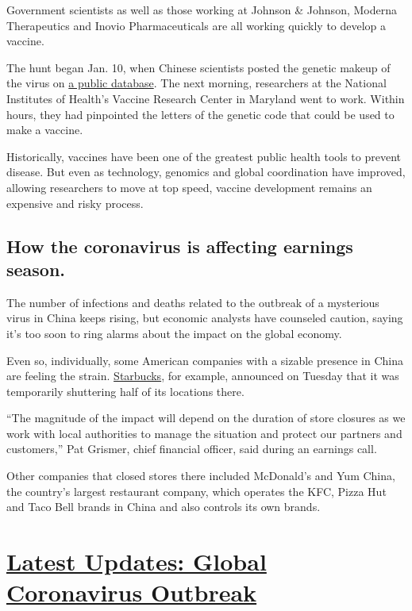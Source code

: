 Government scientists as well as those working at Johnson \& Johnson,
Moderna Therapeutics and Inovio Pharmaceuticals are all working quickly
to develop a vaccine.

The hunt began Jan. 10, when Chinese scientists posted the genetic
makeup of the virus on
\href{https://www.ncbi.nlm.nih.gov/nuccore/MN908947}{a public database}.
The next morning, researchers at the National Institutes of Health's
Vaccine Research Center in Maryland went to work. Within hours, they had
pinpointed the letters of the genetic code that could be used to make a
vaccine.

Historically, vaccines have been one of the greatest public health tools
to prevent disease. But even as technology, genomics and global
coordination have improved, allowing researchers to move at top speed,
vaccine development remains an expensive and risky process.

\hypertarget{how-the-coronavirus-is-affecting-earnings-season}{%
\subsection{How the coronavirus is affecting earnings
season.}\label{how-the-coronavirus-is-affecting-earnings-season}}

The number of infections and deaths related to the outbreak of a
mysterious virus in China keeps rising, but economic analysts have
counseled caution, saying it's too soon to ring alarms about the impact
on the global economy.

Even so, individually, some American companies with a sizable presence
in China are feeling the strain.
\href{https://s22.q4cdn.com/869488222/files/doc_financials/2020/Q1/Q1-FY20-Earnings-Release.pdf}{Starbucks},
for example, announced on Tuesday that it was temporarily shuttering
half of its locations there.

``The magnitude of the impact will depend on the duration of store
closures as we work with local authorities to manage the situation and
protect our partners and customers,'' Pat Grismer, chief financial
officer, said during an earnings call.

Other companies that closed stores there included McDonald's and Yum
China, the country's largest restaurant company, which operates the KFC,
Pizza Hut and Taco Bell brands in China and also controls its own
brands.

\hypertarget{latest-updates-global-coronavirus-outbreak}{%
\section{\texorpdfstring{\href{https://www.nytimes.com/2020/08/01/world/coronavirus-covid-19.html?action=click\&pgtype=Article\&state=default\&region=MAIN_CONTENT_1\&context=storylines_live_updates}{Latest
Updates: Global Coronavirus
Outbreak}}{Latest Updates: Global Coronavirus Outbreak}}\label{latest-updates-global-coronavirus-outbreak}}

